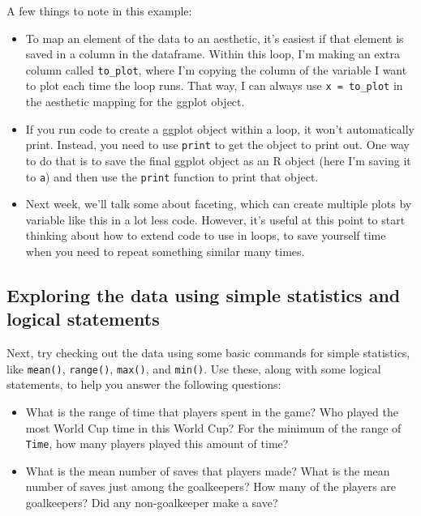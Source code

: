 \documentclass[]{book}
\providecommand{\tightlist}{%
  \setlength{\itemsep}{0pt}\setlength{\parskip}{0pt}}
\theoremstyle{definition}
\theoremstyle{definition}
\theoremstyle{definition}
\theoremstyle{remark}
\begin{document}
A few things to note in this example:

\begin{itemize}
\tightlist
\item
  To map an element of the data to an aesthetic, it's easiest if that
  element is saved in a column in the dataframe. Within this loop, I'm
  making an extra column called \texttt{to\_plot}, where I'm copying the
  column of the variable I want to plot each time the loop runs. That
  way, I can always use \texttt{x\ =\ to\_plot} in the aesthetic mapping
  for the ggplot object.
\item
  If you run code to create a ggplot object within a loop, it won't
  automatically print. Instead, you need to use \texttt{print} to get
  the object to print out. One way to do that is to save the final
  ggplot object as an R object (here I'm saving it to \texttt{a}) and
  then use the \texttt{print} function to print that object.
\item
  Next week, we'll talk some about faceting, which can create multiple
  plots by variable like this in a lot less code. However, it's useful
  at this point to start thinking about how to extend code to use in
  loops, to save yourself time when you need to repeat something similar
  many times.
\end{itemize}

\subsection{Exploring the data using simple statistics and logical
statements}\label{exploring-the-data-using-simple-statistics-and-logical-statements}

Next, try checking out the data using some basic commands for simple
statistics, like \texttt{mean()}, \texttt{range()}, \texttt{max()}, and
\texttt{min()}. Use these, along with some logical statements, to help
you answer the following questions:

\begin{itemize}
\tightlist
\item
  What is the range of time that players spent in the game? Who played
  the most World Cup time in this World Cup? For the minimum of the
  range of \texttt{Time}, how many players played this amount of time?
\item
  What is the mean number of saves that players made? What is the mean
  number of saves just among the goalkeepers? How many of the players
  are goalkeepers? Did any non-goalkeeper make a save?
\end{itemize}
\end{document}
